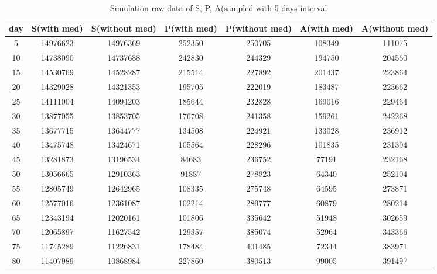 {\begin{appendices}
\begin{longtable}{|>{\small}c|>{\small}c|>{\small}c|>{\small}c|>{\small}c|>{\small}c|>{\small}c|}
\caption{Simulation raw data of S, P, A(sampled with 5 days interval}\\
\hline
 {\bf day} & {\bf S(with med)} & {\bf S(without med)} & {\bf P(with med)} & {\bf P(without med)} & {\bf A(with med)} & {\bf A(without med)} \\
\hline
         5 &   14976623 &   14976369 &     252350 &     250705 &     108349 &     111075 \\
\hline
        10 &   14738090 &   14737688 &     242830 &     244329 &     194750 &     204560 \\
\hline
        15 &   14530769 &   14528287 &     215514 &     227892 &     201437 &     223864 \\
\hline
        20 &   14329028 &   14321353 &     195705 &     222019 &     183487 &     223662 \\
\hline
        25 &   14111004 &   14094203 &     185644 &     232828 &     169016 &     229464 \\
\hline
        30 &   13877055 &   13853705 &     176708 &     241358 &     159261 &     242268 \\
\hline
        35 &   13677715 &   13644777 &     134508 &     224921 &     133028 &     236912 \\
\hline
        40 &   13475748 &   13424671 &     105564 &     228296 &     101835 &     231394 \\
\hline
        45 &   13281873 &   13196534 &      84683 &     236752 &      77191 &     232168 \\
\hline
        50 &   13056665 &   12910363 &      91887 &     278823 &      64340 &     252104 \\
\hline
        55 &   12805749 &   12642965 &     108335 &     275748 &      64595 &     273871 \\
\hline
        60 &   12577016 &   12361087 &     102214 &     289777 &      60879 &     280214 \\
\hline
        65 &   12343194 &   12020161 &     101806 &     335642 &      51948 &     302659 \\
\hline
        70 &   12065897 &   11627542 &     129357 &     385074 &      52964 &     343366 \\
\hline
        75 &   11745289 &   11226831 &     178484 &     401485 &      72344 &     383971 \\
\hline
        80 &   11407989 &   10868984 &     227860 &     380513 &      99005 &     391497 \\

\end{longtable}
\end{appendices}}
